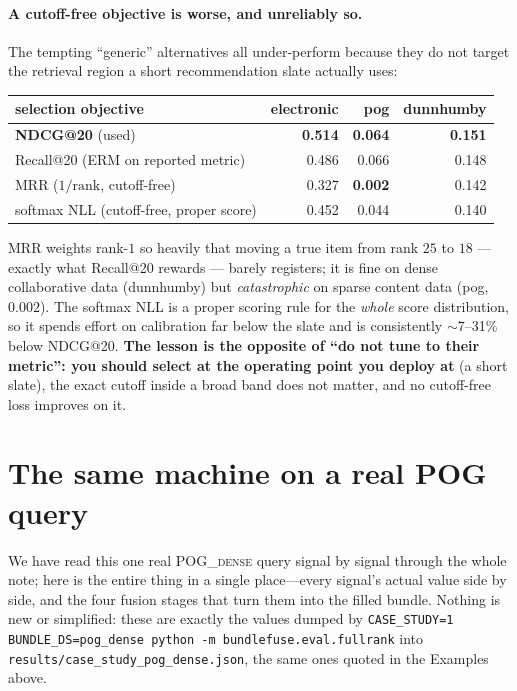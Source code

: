 \documentclass[11pt]{article}
\theoremstyle{remark}
\newcommand{\code}[1]{\texttt{\small #1}}
\begin{document}
\paragraph{A cutoff-free objective is worse, and unreliably so.} The tempting ``generic'' alternatives all
under-perform because they do not target the retrieval region a short recommendation slate actually uses:

\begin{center}\small
\begin{tabular}{@{}l r r r@{}}
\toprule
selection objective & electronic & pog & dunnhumby \\
\midrule
\textbf{NDCG@20} (used) & \textbf{0.514} & \textbf{0.064} & \textbf{0.151} \\
Recall@20 (ERM on reported metric) & 0.486 & 0.066 & 0.148 \\
MRR ($1/\text{rank}$, cutoff-free) & 0.327 & \textbf{0.002} & 0.142 \\
softmax NLL (cutoff-free, proper score) & 0.452 & 0.044 & 0.140 \\
\bottomrule
\end{tabular}
\end{center}

\noindent MRR weights rank-$1$ so heavily that moving a true item from rank $25$ to $18$ --- exactly what
Recall@20 rewards --- barely registers; it is fine on dense collaborative data (dunnhumby) but
\emph{catastrophic} on sparse content data (pog, $0.002$). The softmax NLL is a proper scoring rule for the
\emph{whole} score distribution, so it spends effort on calibration far below the slate and is consistently
$\sim$7--31\% below NDCG@20. \textbf{The lesson is the opposite of ``do not tune to their metric'': you should
select at the operating point you deploy at} (a short slate), the exact cutoff inside a broad band does not
matter, and no cutoff-free loss improves on it.

\section{The same machine on a real \textsc{POG} query}
\label{sec:pog}

We have read this one real \textsc{POG\_dense} query signal by signal through the whole note; here is the entire thing
in a single place---every signal's actual value side by side, and the four fusion stages that turn them into the
filled bundle. Nothing is new or simplified: these are exactly the values dumped by \code{CASE\_STUDY=1
BUNDLE\_DS=pog\_dense python -m bundlefuse.eval.fullrank} into \code{results/case\_study\_pog\_dense.json}, the same
ones quoted in the Examples above.
\end{document}
